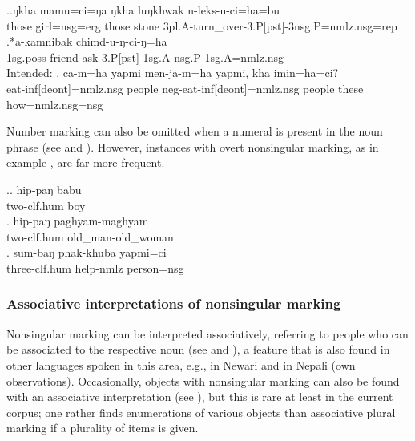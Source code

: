 \ex.\ag.ŋkha mamu=ci=ŋa ŋkha luŋkhwak n-leks-u-ci=ha=bu\\
 those girl{\sc =nsg=erg} those stone {\sc 3pl.A-}turn\_over{\sc -3.P[pst]-3nsg.P=nmlz.nsg=rep}\\
  
\bg.*a-kamnibak chimd-u-ŋ-ci-ŋ=ha\\
{\sc 1sg.poss-}friend ask{\sc -3.P[pst]-1sg.A-nsg.P-1sg.A=nmlz.nsg}\\
Intended:  
\bg. ca-m=ha  yapmi  men-ja-m=ha yapmi,  kha imin=ha=ci?\\
	eat-{\sc inf[deont]=nmlz.nsg} people {\sc neg}-eat-{\sc inf[deont]=nmlz.nsg} people these how{\sc =nmlz.nsg=nsg} 		\\
	 
	
	
Number marking can also be omitted when a numeral is present in the noun phrase (see \Next[a] and \Next[b]). However, instances with overt nonsingular marking, as in  example \Next[c], are far more frequent.

\ex.\ag.  hip-paŋ     babu\\
two{\sc -clf.hum} boy\\
\bg. hip-paŋ     paghyam-maghyam\\
two{\sc -clf.hum} old\_man-old\_woman\\
 
\bg. sum-baŋ       phak-khuba      yapmi=ci\\
three{\sc -clf.hum} help{\sc -nmlz} person{\sc =nsg}\\
  
  

\subsubsection{Associative interpretations of nonsingular marking}\label{number-2}

Nonsingular marking can be interpreted associatively, referring to people who can be associated to the respective noun (see \Next[a] and \Next[b]), a feature that is also found in other languages spoken in this area, e.g., in Newari \cite[98]{Genetti2007_Newari} and in Nepali (own observations). Occasionally, objects with nonsingular marking can also be found with an associative interpretation (see \Next[c]), but this is rare at least in the current corpus; one rather finds enumerations of various objects than associative plural marking if a plurality of items is given.
                                      

